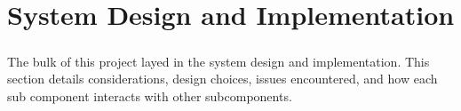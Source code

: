 \chapter{System Design and Implementation}

\paragraph{}
The bulk of this project layed in the system design and implementation.
This section details considerations, design choices, issues encountered, and how each sub component interacts with other subcomponents.